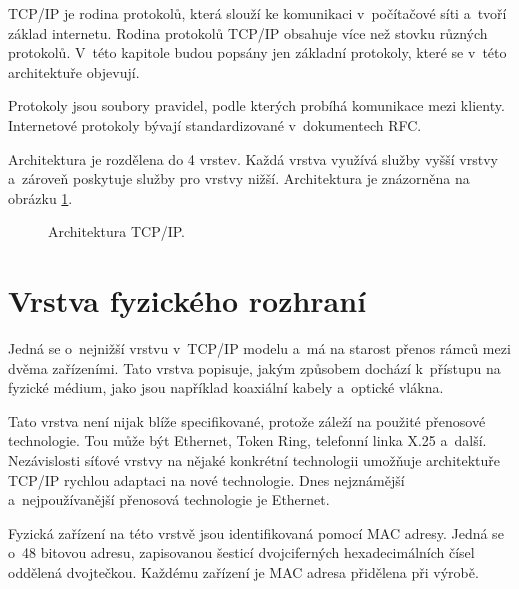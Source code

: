 TCP/IP je rodina protokolů, která slouží ke komunikaci v~počítačové síti a~tvoří základ internetu. Rodina protokolů TCP/IP obsahuje více než stovku různých protokolů. V~této kapitole budou popsány jen základní protokoly, které se v~této architektuře objevují.

Protokoly jsou soubory pravidel, podle kterých probíhá komunikace mezi klienty. Internetové protokoly bývají standardizované v~dokumentech RFC.

Architektura je rozdělena do 4 vrstev. Každá vrstva využívá služby vyšší vrstvy a~zároveň poskytuje služby pro vrstvy nižší. Architektura je znázorněna na obrázku \ref{img:architektura_tcpip}. 

\begin{figure}[H]
    \centering
    \caption{Architektura TCP/IP.}
    \label{img:architektura_tcpip}
\end{figure}

\section{Vrstva fyzického rozhraní}
Jedná se o~nejnižší vrstvu v~TCP/IP modelu a~má na starost přenos rámců mezi dvěma zařízeními. Tato vrstva popisuje, jakým způsobem dochází k~přístupu na fyzické médium, jako jsou například koaxiální kabely a~optické vlákna.

Tato vrstva není nijak blíže specifikované, protože záleží na použité přenosové technologie. Tou může být Ethernet, Token Ring, telefonní linka X.25 a~další. Nezávislosti síťové vrstvy na nějaké konkrétní technologii umožňuje architektuře TCP/IP rychlou adaptaci na nové technologie. Dnes nejznámější a~nejpoužívanější přenosová technologie je Ethernet.

Fyzická zařízení na této vrstvě jsou identifikovaná pomocí MAC adresy. Jedná se o~48 bitovou adresu, zapisovanou šesticí dvojciferných hexadecimálních čísel oddělená dvojtečkou. Každému zařízení je MAC adresa přidělena při výrobě.

